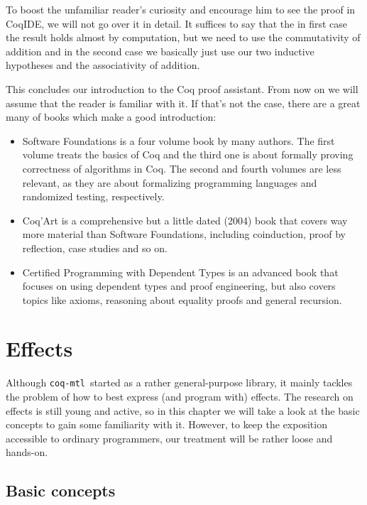 \documentclass[declaration,inz,english,shortabstract]{iithesis}
\newcommand{\libname}{\m{coq-mtl}}
\newcommand{\m}[1]{\texttt{#1}}
\begin{document}
To boost the unfamiliar reader's curiosity and encourage him to see the proof in CoqIDE, we will not go over it in detail. It suffices to say that the in first case the result holds almost by computation, but we need to use the commutativity of addition and in the second case we basically just use our two inductive hypotheses and the associativity of addition.

This concludes our introduction to the Coq proof assistant. From now on we will assume that the reader is familiar with it. If that's not the case, there are a great many of books which make a good introduction:

\begin{itemize}
    \item Software Foundations \cite{SoftwareFoundations} is a four volume book by many authors. The first volume treats the basics of Coq and the third one is about formally proving correctness of algorithms in Coq. The second and fourth volumes are less relevant, as they are about formalizing programming languages and randomized testing, respectively.
    \item Coq'Art \cite{CoqArt} is a comprehensive but a little dated (2004) book that covers way more material than Software Foundations, including coinduction, proof by reflection, case studies and so on.
    \item Certified Programming with Dependent Types \cite{CPDT} is an advanced book that focuses on using dependent types and proof engineering, but also covers topics like axioms, reasoning about equality proofs and general recursion.
\end{itemize}

\chapter{Effects} \label{ch2}

Although \libname\ started as a rather general-purpose library, it mainly tackles the problem of how to best express (and program with) effects. The research on effects is still young and active, so in this chapter we will take a look at the basic concepts to gain some familiarity with it. However, to keep the exposition accessible to ordinary programmers, our treatment will be rather loose and hands-on.

\section{Basic concepts}
\end{document}
